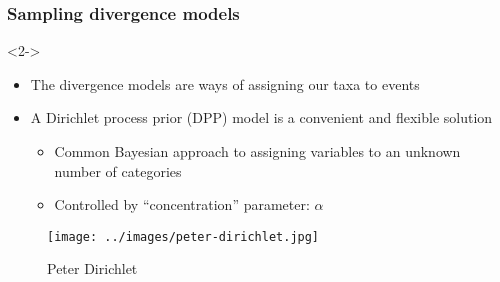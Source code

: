 \begin{frame}[t]
    \frametitle{Sampling divergence models}
    \begin{uncoverenv}<2->
    \begin{itemize}
        \item The divergence models are ways of assigning our taxa to events
        \item A Dirichlet process prior (DPP) model is a convenient and flexible
            solution
            \begin{itemize}
                \item Common Bayesian approach to assigning variables to an
                    unknown number of categories
                \item Controlled by ``concentration'' parameter: $\alpha$
            \end{itemize}
    \end{itemize}

    \begin{figure}
    \begin{center}
        \texttt{[image: ../images/peter-dirichlet.jpg]}
        \caption{Peter Dirichlet}
    \end{center}
    \end{figure}
    \end{uncoverenv}
\end{frame}

